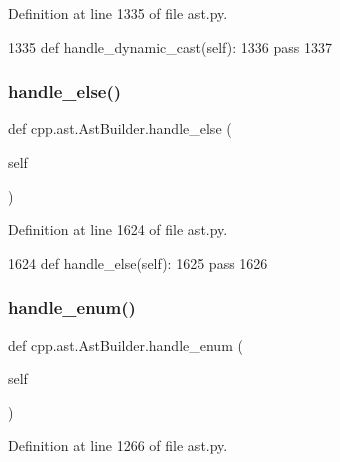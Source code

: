 Definition at line 1335 of file ast.\+py.


\begin{DoxyCode}
1335     \textcolor{keyword}{def }handle\_dynamic\_cast(self):
1336         \textcolor{keywordflow}{pass}
1337 
\end{DoxyCode}
\mbox{\label{classcpp_1_1ast_1_1AstBuilder_aeb676b03467a93454be018ac243f89a2}} 
\subsubsection{\texorpdfstring{handle\+\_\+else()}{handle\_else()}}
{\footnotesize\ttfamily def cpp.\+ast.\+Ast\+Builder.\+handle\+\_\+else (\begin{DoxyParamCaption}\item[{}]{self }\end{DoxyParamCaption})}



Definition at line 1624 of file ast.\+py.


\begin{DoxyCode}
1624     \textcolor{keyword}{def }handle\_else(self):
1625         \textcolor{keywordflow}{pass}
1626 
\end{DoxyCode}
\mbox{\label{classcpp_1_1ast_1_1AstBuilder_a341a6ffabadd444a345c8c98a611774c}} 
\subsubsection{\texorpdfstring{handle\+\_\+enum()}{handle\_enum()}}
{\footnotesize\ttfamily def cpp.\+ast.\+Ast\+Builder.\+handle\+\_\+enum (\begin{DoxyParamCaption}\item[{}]{self }\end{DoxyParamCaption})}



Definition at line 1266 of file ast.\+py.




